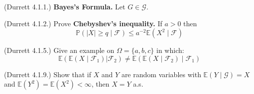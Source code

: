 \documentclass[12pt]{gradescopeexam}
\renewcommand\P{\mathbb{P}}
\newcommand\E{\mathbb{E}}
\renewcommand\c[1]{\mathcal{#1}}
\begin{document}
\makeheader
\vspace{0.1in}
\begin{questions}
  \begin{question}
    (Durrett 4.1.1.) \textbf{Bayes's Formula.} Let $G\in\c{G}$.
  \end{question}

  \begin{question}
    (Durrett 4.1.2.) Prove \textbf{Chebyshev's inequality.} If $a>0$ then
    \[ \P(|X|\ge q \mid \c{F}) \le a^{-2} \E(X^2 \mid \c{F}) \]
    \begin{prooforbox}[6.5in]
    \end{prooforbox}
  \end{question}

  \begin{question}
    (Durrett 4.1.5.) Give an example on $\Omega=\{a,b,c\}$ in which:
    \[ \E(\E(X \mid \c{F}_1)|\c{F}_2) \neq \E(\E(X \mid \c{F}_2)\mid \c{F}_1)  \]
    \begin{solutionorbox}[6.5in]
    \end{solutionorbox}
  \end{question}

  \begin{question}
    (Durrett 4.1.9.) Show that if $X$ and $Y$ are random variables with $\E(Y\mid \c{G})=X$ and
    $\E(Y^2)=\E(X^2)<\infty$, then $X=Y$ a.s.
    \begin{solutionorbox}[6.5in]
    \end{solutionorbox}
  \end{question}


\end{questions}
\end{document}
